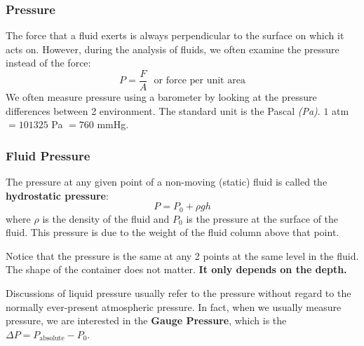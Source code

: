 \documentclass[11pt]{article}
\numberwithin{equation}{section}
\begin{document}
			\subsubsection{Pressure}
			The force that a fluid exerts is always perpendicular to the surface on which it acts on.  However, during the analysis of fluids, we often examine the pressure instead of the force:
			\begin{equation}
			P=\frac{F}{A} ~~~ \text{or force per unit area}
			\end{equation}					
			We often measure pressure using a barometer by looking at the pressure differences between 2 environment. The standard unit is the Pascal \textit{(Pa)}. $1$ atm $= 101325$ Pa $= 760$ mmHg.
			\subsubsection{Fluid Pressure}
			\begin{shaded}
				The pressure at any given point of a non-moving (static) fluid is called the \textbf{hydrostatic pressure}:
				\begin{equation}
					\label{eqn:fluidpressure}
					P = P_0 + \rho g h 
				\end{equation}
				where $\rho$ is the density of the fluid and $P_0$ is the pressure at the surface of the fluid. This pressure is due to the weight of the fluid column above that point.
			\end{shaded}
			Notice that the pressure is the same at any 2 points at the same level in the fluid. The shape of the container does not matter.  \textbf{It only depends on the depth.}
			
			
			Discussions of liquid pressure usually refer to the pressure without regard to the normally ever-present atmospheric pressure. In fact, when we usually measure pressure, we are interested in the \textbf{Gauge Pressure}, which is the $\Delta P = P_{\text{absolute}} - P_0$. 
			
\end{document}
